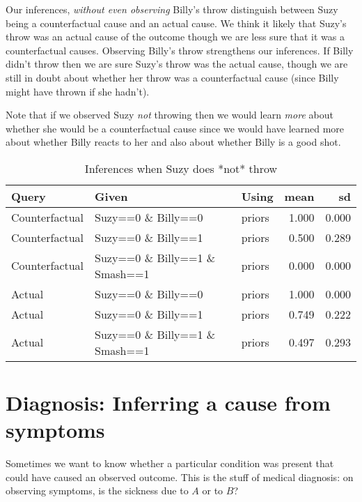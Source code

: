 \documentclass[
  12pt,
]{book}
\begin{document}
Our inferences, \emph{without even observing} Billy's throw distinguish between Suzy being a counterfactual cause and an actual cause. We think it likely that Suzy's throw was an actual cause of the outcome though we are less sure that it was a counterfactual causes. Observing Billy's throw strengthens our inferences. If Billy didn't throw then we are sure Suzy's throw was the actual cause, though we are still in doubt about whether her throw was a counterfactual cause (since Billy might have thrown if she hadn't).

Note that if we observed Suzy \emph{not} throwing then we would learn \emph{more} about whether she would be a counterfactual cause since we would have learned more about whether Billy reacts to her and also about whether Billy is a good shot.

\begin{table}

\caption{\label{tab:appbillysuzy3}Inferences when Suzy does *not* throw}
\centering
\begin{tabular}[t]{l|l|l|r|r}
\hline
Query & Given & Using & mean & sd\\
\hline
Counterfactual & Suzy==0 \& Billy==0 & priors & 1.000 & 0.000\\
\hline
Counterfactual & Suzy==0 \& Billy==1 & priors & 0.500 & 0.289\\
\hline
Counterfactual & Suzy==0 \& Billy==1 \& Smash==1 & priors & 0.000 & 0.000\\
\hline
Actual & Suzy==0 \& Billy==0 & priors & 1.000 & 0.000\\
\hline
Actual & Suzy==0 \& Billy==1 & priors & 0.749 & 0.222\\
\hline
Actual & Suzy==0 \& Billy==1 \& Smash==1 & priors & 0.497 & 0.293\\
\hline
\end{tabular}
\end{table}

\hypertarget{diagnosis-inferring-a-cause-from-symptoms}{%
\section{Diagnosis: Inferring a cause from symptoms}\label{diagnosis-inferring-a-cause-from-symptoms}}

Sometimes we want to know whether a particular condition was present that could have caused an observed outcome. This is the stuff of medical diagnosis: on observing symptoms, is the sickness due to \(A\) or to \(B\)?
\end{document}

